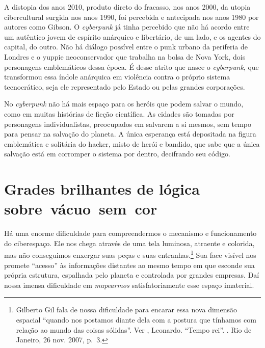 A distopia dos anos 2010, produto direto do fracasso, nos anos 2000, da utopia cibercultural surgida nos anos 1990, foi percebida e antecipada nos anos 1980 por autores como Gibson. O \emph{cyberpunk} já tinha percebido que não há acordo
entre um autêntico jovem de espírito anárquico e libertário, de um lado, e os
agentes do capital, do outro. Não há diálogo possível entre o punk
urbano da periferia de Londres e o yuppie neoconservador que trabalha na
bolsa de Nova York, dois personagens emblemáticos dessa época. É desse
atrito que nasce o \emph{cyberpunk}, que transformou essa índole
anárquica em violência contra o próprio sistema tecnocrático, seja ele
representado pelo Estado ou pelas grandes corporações.

No \emph{cyberpunk} não há mais espaço para os heróis que podem salvar o mundo,
como em muitas histórias de ficção científica. As cidades são tomadas
por personagens individualistas, preocupados em salvarem a si mesmos, sem
tempo para pensar na salvação do planeta. A única esperança está
depositada na figura emblemática e solitária do hacker, misto de herói e
bandido, que sabe que a única salvação está em corromper o sistema por
dentro, decifrando seu código.

\chapter[Grades brilhantes de lógica sobre vácuo sem cor]{Grades brilhantes de lógica sobre~vácuo~sem~cor}

Há uma enorme dificuldade para compreendermos o mecanismo e
funcionamento do ciberespaço. Ele nos chega através de uma tela
luminosa, atraente e colorida, mas não conseguimos enxergar suas peças e
suas entranhas.\footnote{Gilberto Gil fala de nossa dificuldade para
  encarar essa nova dimensão espacial ``quando nos postamos diante dela
  com a postura que tínhamos com relação ao mundo das coisas sólidas''.
  Ver , Leonardo. ``Tempo rei''. {}. Rio de Janeiro, 26
  nov. 2007, p.~3.} Sua face visível nos promete ``acesso'' às
informações distantes ao mesmo tempo em que esconde sua própria
estrutura, espalhada pelo planeta e controlada por grandes empresas. Daí
nossa imensa dificuldade em \emph{mapearmos} satisfatoriamente esse
espaço imaterial.

